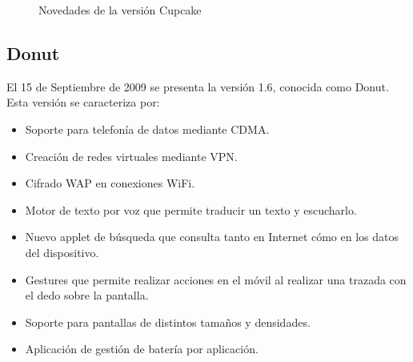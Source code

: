 \begin{figure}[!h]
	\centering	
	\hspace{0.8cm}
	\caption{Novedades de la versión Cupcake}
\end{figure}


\subsection{Donut}

El 15 de Septiembre de 2009 se presenta la versión 1.6, conocida como Donut. Esta versión se caracteriza por:

\begin{itemize}
\item Soporte para telefonía de datos mediante CDMA.
\item Creación de redes virtuales mediante VPN.
\item Cifrado WAP en conexiones WiFi.
\item Motor de texto por voz que permite traducir un texto y escucharlo.
\item Nuevo applet de búsqueda que consulta tanto en Internet cómo en los datos del dispositivo.
\item Gestures que permite realizar acciones en el móvil al realizar una trazada con el dedo sobre la pantalla.
\item Soporte para pantallas de distintos tamaños y densidades.
\item Aplicación de gestión de batería por aplicación.
\end{itemize}

